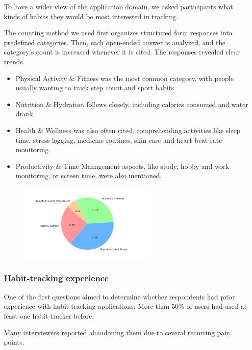 \documentclass{article}
\begin{document}
To have a wider view of the application domain, we asked participants what kinds of habits they would be most interested in tracking.

\label{parag:stats-method}
The counting method we used first organizes structured form responses into predefined categories.
Then, each open-ended answer is analyzed, and the category’s count is increased whenever it is cited.
The responses revealed clear trends.

\begin{itemize}
    \item Physical Activity \& Fitness was the most common category, with people usually wanting to track step count and sport habits.
    \item Nutrition \& Hydration follows closely, including calories consumed and water drank.
    \item Health \& Wellness was also often cited, comprehending activities like sleep time, stress logging, medicine routines, skin care and heart beat rate monitoring.
    \item Productivity \& Time Management aspects, like study, hobby and work monitoring, or screen time, were also mentioned.
\end{itemize}

\begin{figure}[H]
    \centering
    \includegraphics[width=0.6\textwidth]{images/tracked-categories.png}
\end{figure}

\subsubsection{Habit-tracking experience}

One of the first questions aimed to determine whether respondents had prior experience with habit-tracking applications.
More than 50\% of users had used at least one habit tracker before.

Many interviewees reported abandoning them due to several recurring pain points.
\end{document}
